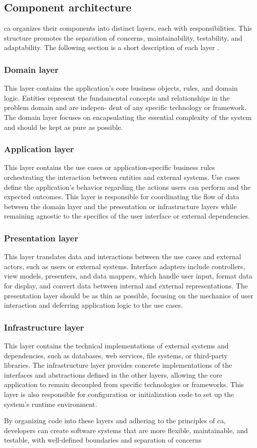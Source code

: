 \subsection{Component architecture} \label{subsec_layers}

\gls{ca} organizes their components into distinct layers, each with responsibilities. This
structure promotes the separation of concerns, maintainability, testability, and
adaptability. The following section is a short description of each layer
\parencite{robert_c_martin_clean_2018}.

\subsubsection{Domain layer}
This layer contains the application's core business objects, rules, and domain logic. Entities
represent the fundamental concepts and relationships in the problem domain and are indepen-
dent of any specific technology or framework. The domain layer focuses on encapsulating the
essential complexity of the system and should be kept as pure as possible.

\subsubsection{Application layer}
This layer contains the use cases or application-specific business rules orchestrating the
interaction between entities and external systems. Use cases define the application's
behavior regarding the actions users can perform and the expected outcomes. This layer is
responsible for coordinating the flow of data between the domain layer and the
presentation or infrastructure layers while remaining agnostic to the specifics of the
user interface or external dependencies.

\subsubsection{Presentation layer}
This layer translates data and interactions between the use cases and external actors,
such as users or external systems. Interface adapters include controllers, view models,
presenters, and data mappers, which handle user input, format data for display, and
convert data between internal and external representations. The presentation layer should
be as thin as possible, focusing on the mechanics of user interaction and deferring
application logic to the use cases.

\subsubsection{Infrastructure layer}
This layer contains the technical implementations of external systems and dependencies,
such as databases, web services, file systems, or third-party libraries. The
infrastructure layer provides concrete implementations of the interfaces and abstractions
defined in the other layers, allowing the core application to remain decoupled from
specific technologies or frameworks. This layer is also responsible for configuration or
initialization code to set up the system's runtime environment.

By organizing code into these layers and adhering to the principles of \gls{ca},
developers can create software systems that are more flexible, maintainable, and testable,
with well-defined boundaries and separation of concerns